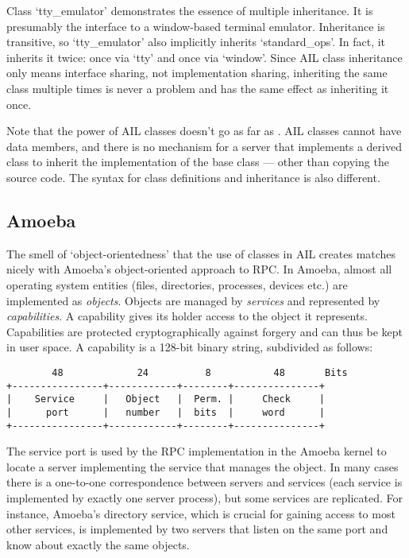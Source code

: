 Class `tty\_emulator' demonstrates the essence of multiple inheritance.
It is presumably the interface to a window-based terminal emulator.
Inheritance is transitive, so `tty\_emulator' also implicitly inherits
`standard\_ops'.
In fact, it inherits it twice: once via `tty' and once via `window'.
Since AIL class inheritance only means interface sharing, not
implementation sharing, inheriting the same class multiple times is
never a problem and has the same effect as inheriting it once.

Note that the power of AIL classes doesn't go as far as \Cpp{}.
AIL classes cannot have data members, and there is
no mechanism for a server that implements a derived class
to inherit the implementation of the base
class --- other than copying the source code.
The syntax for class definitions and inheritance is also different.

\subsection{Amoeba}

The smell of `object-orientedness' that the use of classes in AIL
creates matches nicely with Amoeba's object-oriented approach to
RPC\@.  In Amoeba, almost all operating system entities (files,
directories, processes, devices etc.) are implemented as {\em
objects}.  Objects are managed by {\em services} and represented by
{\em capabilities}.  A capability gives its holder access to the
object it represents.  Capabilities are protected cryptographically
against forgery and can thus be kept in user space.  A capability is a
128-bit binary string, subdivided as follows:

\begin{verbatim}
        48             24          8           48       Bits
+----------------+------------+--------+---------------+
|    Service     |   Object   |  Perm. |     Check     |
|      port      |   number   |  bits  |     word      |
+----------------+------------+--------+---------------+
\end{verbatim}

The service port is used by the RPC implementation in the Amoeba
kernel to locate a server implementing the service that manages the
object.  In many cases there is a one-to-one correspondence between
servers and services (each service is implemented by exactly one
server process), but some services are replicated.  For instance,
Amoeba's directory service, which is crucial for gaining access to most
other services, is implemented by two servers that listen on the same
port and know about exactly the same objects.

